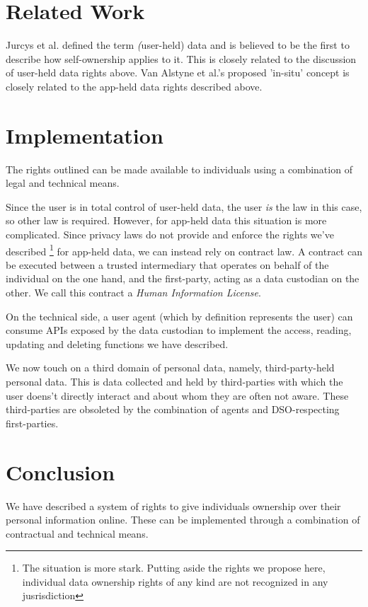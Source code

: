 \documentclass[11pt, oneside]{article}   	%
\begin{document}
\section{Related Work}

Jurcys et al.\cite{Jurcys2021} defined the term \emph(user-held) data and is believed to be the first to describe how self-ownership applies to it. This is closely related to the discussion of user-held data rights above. Van Alstyne et al.\cite{Alstyne2021}'s proposed 'in-situ' concept is closely related to the app-held data rights described above.

\section{Implementation}
The rights outlined can be made available to individuals using a combination of legal and technical means. 

Since the user is in total control of user-held data, the user \emph{is} the law in this case, so other law is required. However, for app-held data this situation is more complicated. Since privacy laws do not provide and enforce the rights we've described \footnote{The situation is more stark. Putting aside the rights we propose here, individual data ownership rights of any kind are not recognized in any jusrisdiction} for app-held data, we can instead rely on contract law. A contract can be executed between a trusted intermediary that operates on behalf of the individual on the one hand, and the first-party, acting as a data custodian on the other. We call this contract a \emph{Human Information License}. 

On the technical side, a user agent (which by definition represents the user) can consume APIs exposed by the data custodian to implement the access, reading, updating and deleting functions we have described. 

We now touch on a third domain of personal data, namely, third-party-held personal data. This is data collected and held by third-parties with which the user doens't directly interact and about whom they are often not aware. These third-parties are obsoleted by the combination of agents and DSO-respecting first-parties.  

\section{Conclusion}
We have described a system of rights to give individuals ownership over their personal information online. These can be implemented through a combination of contractual and technical means.



\end{document}
